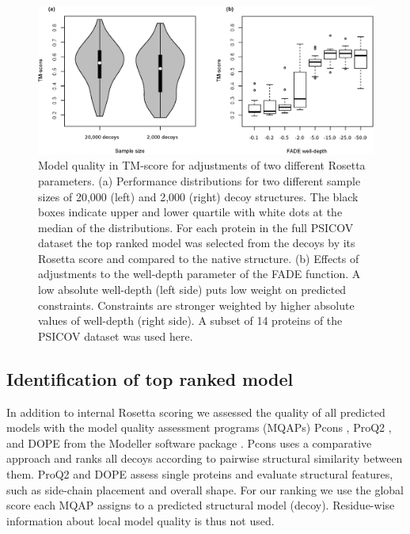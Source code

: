 \documentclass{bioinfo}
\begin{document}
\begin{methods}
\begin{figure}[!tpb]%
\centerline{\includegraphics[scale=0.7]{figures/rosetta.eps}}
\caption{Model quality in TM-score for adjustments of two
 different Rosetta parameters. (a) Performance distributions 
 for two different sample sizes of 20,000 (left) and 2,000 (right) 
 decoy structures. The black boxes indicate upper and lower 
 quartile with white dots at the median of the distributions. For each 
 protein in the full PSICOV dataset the top 
 ranked model was selected from the decoys by its Rosetta score and 
 compared to the native structure. (b) Effects of adjustments to 
 the well-depth parameter of the FADE function. A low absolute 
 well-depth (left side) puts low weight on predicted constraints. 
 Constraints are stronger weighted by higher absolute values of 
 well-depth (right side). A subset of 14 proteins of the PSICOV dataset was used here.}\label{fig:ros} 
\end{figure}



\subsection{Identification of top ranked model}

In addition to internal Rosetta scoring we assessed the quality of all
predicted models with the model quality assessment programs (MQAPs)
Pcons \cite[]{lundstrom_pcons:_2001}, ProQ2
\cite[]{ray_improved_2012}, and DOPE from the Modeller software
package \cite[]{eswar_comparative_2006}. Pcons uses a comparative
approach and ranks all decoys according to pairwise structural
similarity between them. ProQ2 and DOPE assess single proteins and
evaluate structural features, such as side-chain placement and overall
shape. For our ranking we use the global score each MQAP assigns to a
predicted structural model (decoy). Residue-wise information about
local model quality is thus not used. 


\end{methods}
\end{document}
